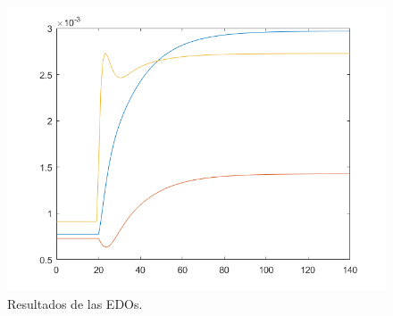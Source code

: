 \begin{figure}[h!]
\includegraphics[scale=0.3]{../c3.png}
\caption{\color{cyan}Resultados de las EDOs.}
\label{circnpnmaxout}
\end{figure}


